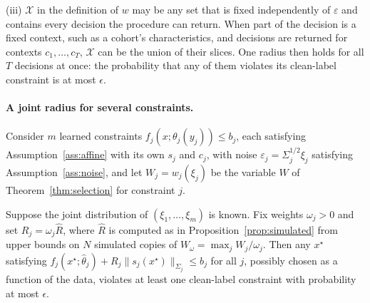 %

(iii) $\mathcal{X}$ in the definition of $w$ may be any set that is fixed
independently of $\varepsilon$ and contains every decision the procedure can
return. When part of the decision is a fixed context, such as a cohort's
characteristics, and decisions are returned for contexts
$c_1,\dots,c_T$, $\mathcal{X}$ can be the union of their slices. One radius
then holds for all $T$ decisions at once: the probability that any of them
violates its clean-label constraint is at most $\epsilon$.

\paragraph{A joint radius for several constraints.}
Consider $m$ learned constraints $f_j(x;\theta_j(y_j)) \le b_j$, each
satisfying Assumption~\ref{ass:affine} with its own $s_j$ and $c_j$, with noise
$\varepsilon_j = \Sigma_j^{1/2}\xi_j$ satisfying Assumption~\ref{ass:noise},
and let $W_j = w_j(\xi_j)$ be the variable $W$ of
Theorem~\ref{thm:selection} for constraint $j$.

\begin{corollary}\label{cor:joint}
Suppose the joint distribution of $(\xi_1,\dots,\xi_m)$ is known. Fix weights
$\omega_j > 0$ and set $R_j = \omega_j\hat R$, where $\hat R$ is computed as in
Proposition~\ref{prop:simulated} from upper bounds on $N$ simulated copies of
$W_\omega = \max_j W_j/\omega_j$. Then any $x^\star$ satisfying
$f_j(x^\star;\hat\theta_j) + R_j\|s_j(x^\star)\|_{\Sigma_j} \le b_j$ for all
$j$, possibly chosen as a function of the data, violates at least one
clean-label constraint with probability at most $\epsilon$.
\end{corollary}

